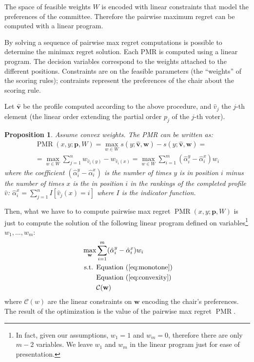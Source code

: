 \documentclass[12pt]{article}
\newcommand{\profile}{\textbf{v}}%
\newcommand{\pprofile}{\textbf{p}}%
\newcommand{\w}{\textbf{w}}%
\newcommand{\C}{\mathcal{C}}%
\DeclareMathOperator{\PMR}{PMR}
\newtheorem{prop}{Proposition}
\begin{document}
The space of feasible weights $W$ is encoded with linear constraints that model the preferences of the committee.
Therefore the pairwise maximum regret can be computed with a linear program.


By solving a sequence of pairwise max regret computations is possible to determine the minimax regret solution.
Each PMR is computed using a linear program.
The decision variables correspond to the weights attached to the different positions.
Constraints are on the feasible parameters (the ``weights'' of the scoring rules); contraints represent the preferences of the chair about the scoring rule.

Let $\hat{\profile}$ be the profile computed according to the above procedure, and  $\hat{v}_j$ the $j$-th element (the linear order extending the partial order $p_j$ of the $j$-th voter).
\begin{prop}
Assume convex weights.
The PMR can be written as:
\begin{align} 
\PMR(x,y; \pprofile, W) =  
\max_{w \in W} s(y; \hat{\profile}, \w) - s(y; \hat{\profile}, \w) =\\
=\max_{w \in W} \sum_{j=1}^n w_{\hat{v}_i(y)} - w_{\hat{v}_i(x)} =
\max_{w \in W} \sum_{i=1}^m (\hat{\alpha}_{i}^{y} - \hat{\alpha}_{i}^{x}) w_i 
\end{align}
where the coefficient $ (\hat{\alpha}_{i}^{y} - \hat{\alpha}_{i}^{x})$ is the number of times $y$ is in position $i$ minus the number of times $x$ is the in position $i$ in the rankings of the completed profile $\hat{v}$:
$\hat{\alpha}_{i}^{x} = \sum_{j=1}^{n}  I[\hat{v}_{j}(x)=i]$ where $I$ is the indicator function.
\end{prop}
Then, what we have to to compute pairwise max regret $\PMR(x,y; \pprofile,W)$ is just to compute the solution of the following linear program defined on variables\footnote{In fact, given our assumptions, $w_{1}=1$ and $w_{m}=0$, therefore there are only $m-2$ variables. We leave $w_{1}$ and $w_{m}$ in the linear program just for ease of presentation.} $w_{1},\ldots,w_{m}$:
\begin{align*}
\max_{\w} & \sum_{i=1}^m (\hat{\alpha}_{i}^{y} - \hat{\alpha}_{i}^{x}) w_{i}\\
\text{ s.t. } & \text{Equation } (\ref{eq:monotone})\\
& \text{Equation } (\ref{eq:convexity})\\
& \C(\w)
\end{align*}
where $\C(w)$ are the linear constraints on $\w$ encoding the chair's preferences.
The result of the optimization is the value of the pairwise max regret $\PMR$.
\end{document}
